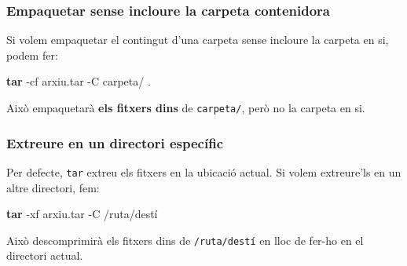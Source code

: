 \documentclass[
  12 pt,
  a4paper,
]{article}
\newenvironment{Shaded}{\begin{snugshade}}{\end{snugshade}}
\newcommand{\AttributeTok}[1]{\textcolor[rgb]{0.13,0.29,0.53}{#1}}
\newcommand{\FunctionTok}[1]{\textcolor[rgb]{0.13,0.29,0.53}{\textbf{#1}}}
\newcommand{\NormalTok}[1]{#1}
\begin{document}
\subsubsection{Empaquetar sense incloure la carpeta
contenidora}\label{empaquetar-sense-incloure-la-carpeta-contenidora}

Si volem empaquetar el contingut d'una carpeta sense incloure la carpeta
en si, podem fer:

\begin{Shaded}
\begin{Highlighting}[]
\FunctionTok{tar} \AttributeTok{{-}cf}\NormalTok{ arxiu.tar }\AttributeTok{{-}C}\NormalTok{ carpeta/ .}
\end{Highlighting}
\end{Shaded}

Això empaquetarà \textbf{els fitxers dins} de \texttt{carpeta/}, però no
la carpeta en si.

\subsubsection{Extreure en un directori
específic}\label{extreure-en-un-directori-especuxedfic}

Per defecte, \texttt{tar} extreu els fitxers en la ubicació actual. Si
volem extreure'ls en un altre directori, fem:

\begin{Shaded}
\begin{Highlighting}[]
\FunctionTok{tar} \AttributeTok{{-}xf}\NormalTok{ arxiu.tar }\AttributeTok{{-}C}\NormalTok{ /ruta/destí}
\end{Highlighting}
\end{Shaded}

Això descomprimirà els fitxers dins de \texttt{/ruta/destí} en lloc de
fer-ho en el directori actual.
\end{document}

